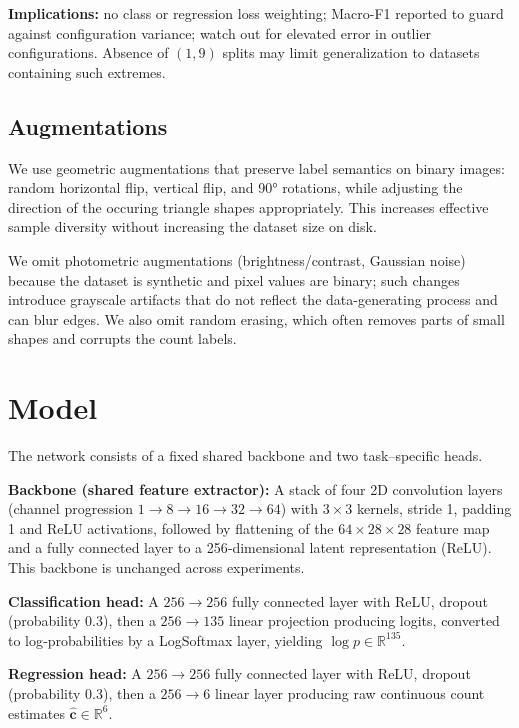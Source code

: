 \documentclass[11pt]{article}
\begin{document}
\textbf{Implications:} no class or regression loss weighting; Macro-F1 reported to guard against configuration variance; watch out for elevated error in outlier configurations. Absence of $(1,9)$ splits may limit generalization to datasets containing such extremes.

\subsection*{Augmentations}

We use geometric augmentations that preserve label semantics on binary images: random horizontal flip, vertical flip, and 90° rotations, while adjusting the direction of the occuring triangle shapes appropriately. This increases effective sample diversity without increasing the dataset size on disk.

We omit photometric augmentations (brightness/contrast, Gaussian noise) because the dataset is synthetic and pixel values are binary; such changes introduce grayscale artifacts that do not reflect the data-generating process and can blur edges. We also omit random erasing, which often removes parts of small shapes and corrupts the count labels.

\section{Model}

The network consists of a fixed shared backbone and two task–specific heads.

\textbf{Backbone (shared feature extractor):} A stack of four 2D convolution layers (channel progression $1\!\rightarrow\!8\!\rightarrow\!16\!\rightarrow\!32\!\rightarrow\!64$) with $3\times3$ kernels, stride 1, padding 1 and ReLU activations, followed by flattening of the $64\times28\times28$ feature map and a fully connected layer to a 256‑dimensional latent representation (ReLU). This backbone is unchanged across experiments.

\textbf{Classification head:} A $256\!\rightarrow\!256$ fully connected layer with ReLU, dropout (probability $0.3$), then a $256\!\rightarrow\!135$ linear projection producing logits, converted to log‑probabilities by a LogSoftmax layer, yielding $\log p \in \mathbb{R}^{135}$.

\textbf{Regression head:} A $256\!\rightarrow\!256$ fully connected layer with ReLU, dropout (probability $0.3$), then a $256\!\rightarrow\!6$ linear layer producing raw continuous count estimates $\hat{\mathbf c}\in\mathbb{R}^6$.
\end{document}
